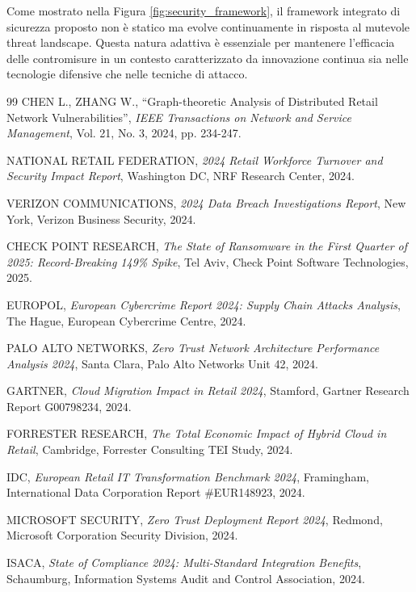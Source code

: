 Come mostrato nella Figura \ref{fig:security_framework}, il framework integrato di sicurezza proposto non è statico ma evolve continuamente in risposta al mutevole threat landscape. Questa natura adattiva è essenziale per mantenere l'efficacia delle contromisure in un contesto caratterizzato da innovazione continua sia nelle tecnologie difensive che nelle tecniche di attacco.

\begin{thebibliography}{99}
 CHEN L., ZHANG W., ``Graph-theoretic Analysis of Distributed Retail Network Vulnerabilities'', \textit{IEEE Transactions on Network and Service Management}, Vol. 21, No. 3, 2024, pp. 234-247.

 NATIONAL RETAIL FEDERATION, \textit{2024 Retail Workforce Turnover and Security Impact Report}, Washington DC, NRF Research Center, 2024.

 VERIZON COMMUNICATIONS, \textit{2024 Data Breach Investigations Report}, New York, Verizon Business Security, 2024.

 CHECK POINT RESEARCH, \textit{The State of Ransomware in the First Quarter of 2025: Record-Breaking 149\% Spike}, Tel Aviv, Check Point Software Technologies, 2025.

 EUROPOL, \textit{European Cybercrime Report 2024: Supply Chain Attacks Analysis}, The Hague, European Cybercrime Centre, 2024.

 PALO ALTO NETWORKS, \textit{Zero Trust Network Architecture Performance Analysis 2024}, Santa Clara, Palo Alto Networks Unit 42, 2024.

 GARTNER, \textit{Cloud Migration Impact in Retail 2024}, Stamford, Gartner Research Report G00798234, 2024.

 FORRESTER RESEARCH, \textit{The Total Economic Impact of Hybrid Cloud in Retail}, Cambridge, Forrester Consulting TEI Study, 2024.

 IDC, \textit{European Retail IT Transformation Benchmark 2024}, Framingham, International Data Corporation Report \#EUR148923, 2024.

 MICROSOFT SECURITY, \textit{Zero Trust Deployment Report 2024}, Redmond, Microsoft Corporation Security Division, 2024.

 ISACA, \textit{State of Compliance 2024: Multi-Standard Integration Benefits}, Schaumburg, Information Systems Audit and Control Association, 2024.


\end{thebibliography}
